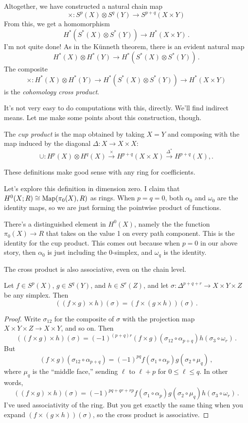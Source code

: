 Altogether, we have constructed a natural chain map
\[
\times:S^p(X)\otimes S^q(Y)\to S^{p+q}(X\times Y)
\]
From this, we get a homomorphism
\[
H^\ast(S^\ast(X)\otimes S^\ast(Y))\to H^\ast(X\times Y)\,.
\]
I'm not quite done! As in the K\"unneth theorem, there is an evident natural 
map 
\[
 H^\ast(X)\otimes H^\ast(Y)\to H^\ast(S^\ast(X)\otimes S^\ast(Y))\,.
\] 
The composite
\[
\times:H^\ast(X)\otimes H^\ast(Y)\to H^\ast(S^\ast(X)\otimes S^\ast(Y))\to H^\ast(X\times Y)
\]
 is the {\em cohomology cross product}.

It's not very easy to do computations with this, directly. We'll find indirect means. Let me make some points about this construction, though.
\begin{definition}
The {\em cup product} is the map obtained by taking $X=Y$ and composing with
the map induced by the diagonal $\Delta:X\to X\times X$:
\[
\cup:H^p(X)\otimes H^q(X)\xrightarrow{\times} H^{p+q}(X\times X)\xrightarrow{\Delta^\ast} H^{p+q}(X),.
\]
\end{definition}
These definitions make good sense with any ring for coefficients.

Let's explore this definition in dimension zero. 
I claim that $ H^0(X;R)\cong\operatorname{Map}(\pi_0(X),R)$ as rings. When $p=q=0$, both $\alpha_0$ and $\omega_0$ are the identity maps, so we are just forming the 
pointwise product of functions. 

There's a distinguished element in $H^0(X)$, namely the the function $\pi_0(X)\to R$ that takes on the value 1 on every path component. 
This is the identity for the cup product. This comes out because when $p=0$ in our above story, then $\alpha_0$ is just including the $0$-simplex, and $\omega_q$ is the identity. 

The cross product is also associative, even on the chain level. 
\begin{prop}
Let $f\in S^p(X)$, $g\in S^q(Y)$, and $h\in S^r(Z)$, and let 
$\sigma:\Delta^{p+q+r}\to X\times Y\times Z$ be any simplex. Then
\[
((f\times g)\times h)(\sigma)=(f\times(g\times h))(\sigma)\,.
\]
\end{prop}
\begin{proof}
Write $\sigma_{12}$ for the composite of $\sigma$ with the projection map
$X\times Y\times Z\to X\times Y$, and so on. Then
\[
((f\times g)\times h)(\sigma)=(-1)^{(p+q)r}
(f\times g)(\sigma_{12}\circ\alpha_{p+q})h(\sigma_3\circ\omega_r)\,.
\]
But 
\[(f\times g)(\sigma_{12}\circ\alpha_{p+q})=(-1)^{pq}
f(\sigma_1\circ\alpha_p)g(\sigma_2\circ\mu_q)\,,
\] 
where $\mu_q$ is the ``middle face,'' sending $\ell$ to $\ell+p$ for
$0\leq\ell\leq q$. In other words, 
\[
((f\times g)\times h)(\sigma)=(-1)^{pq+qr+rp}
f(\sigma_1\circ\alpha_p)g(\sigma_2\circ\mu_q)h(\sigma_3\circ\omega_r)\,.
\]
I've used associativity of the ring. But you get exactly the same thing when
you expand $(f\times(g\times h))(\sigma)$, so the cross product is associative.
\end{proof}

